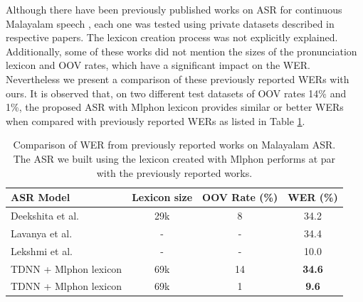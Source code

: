 




Although there have been previously published works on ASR for continuous
Malayalam speech \cite{lavanya2018,deekshitha,sherly_lekshmi_2021}, each one was tested
using private datasets described in respective papers. The lexicon creation
process was not explicitly explained. Additionally, some of these works did not
mention the sizes of the pronunciation lexicon and OOV rates, which have a
significant impact on the WER. Nevertheless we present a comparison of these
previously reported WERs with ours. It is observed that, on two different test
datasets of OOV rates 14\% and 1\%, the proposed ASR with Mlphon lexicon
provides similar or better WERs when compared with previously reported WERs as
listed in Table \ref{tab:asrcomparison}.

\begin{table}[htpb]
	\caption{Comparison of WER from previously reported works on  Malayalam ASR. The ASR we built using the lexicon created with Mlphon performs at par with the previously reported works.}
 	\centering
	\label{tab:asrcomparison}
	\begin{tabular}{lcc|c}
		\hline \hline
		\textbf{ASR Model}                & \textbf{Lexicon size} & \textbf{OOV Rate (\%)} & \textbf{WER (\%)} \\
		\hline
		Deekshita et al.\cite{deekshitha} & 29k                   & 8                      & 34.2              \\
		Lavanya et al. \cite{lavanya2018} & -                     & -                      & 34.4              \\
		Lekshmi et al. \cite{sherly_lekshmi_2021}            & -                     & -                      & 10.0              \\
		TDNN + Mlphon lexicon                     & 69k                   & 14                     & \textbf{34.6}     \\
		TDNN + Mlphon lexicon                   & 69k                   & 1                      & \textbf{9.6}      \\

		\hline\end{tabular}
\end{table}

